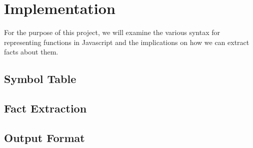 \chapter{Implementation}

For the purpose of this project, we will examine the various syntax for representing functions in Javascript and the implications on how we can extract facts about them.











\section{Symbol Table}

\section{Fact Extraction}

\section{Output Format}
